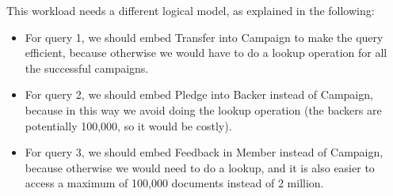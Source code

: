 \documentclass[pdflatex,sn-mathphys-num]{sn-jnl}
\begin{document}
This workload needs a different logical model, as explained in the following:
\begin{itemize}
    \item For query 1, we should embed Transfer into Campaign to make the query efficient, because otherwise we would have to do a lookup operation for all the successful campaigns.
    \item For query 2, we should embed Pledge into Backer instead of Campaign, because in this way we avoid doing the lookup operation (the backers are potentially 100,000, so it would be costly).
    \item For query 3, we should embed Feedback in Member instead of Campaign, because otherwise we would need to do a lookup, and it is also easier to access a maximum of 100,000 documents instead of 2 million.
\end{itemize}
\end{document}
